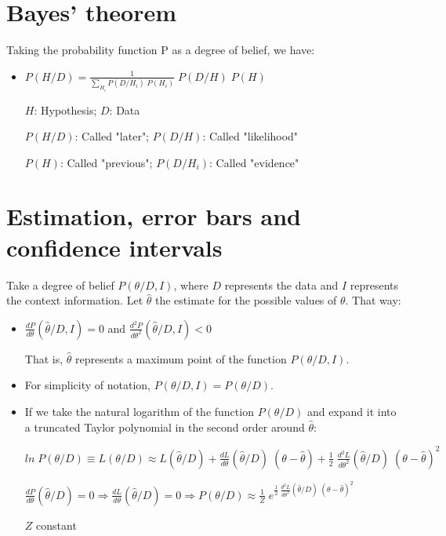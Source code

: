 \documentclass{article}
\begin{document}
\section{Bayes' theorem}

Taking the probability function P as a degree of belief, we have:

\begin{itemize}

\item $P(H/D) = \frac{1}{\sum\limits_{H_{i}} P(D/H_{i}) \; P(H_{i})} \; P(D/H) \; P(H)$

$H$: Hypothesis; $D$: Data

$P(H/D)$: Called "later"; $P(D/H)$: Called "likelihood"

$P(H)$: Called "previous"; $P(D/H_{i})$: Called "evidence"

\end{itemize}

\section{Estimation, error bars and confidence intervals}

Take a degree of belief $P(\theta/D,I)$, where $D$ represents the data and $I$ represents the context information. Let $\hat{\theta}$ the estimate for the possible values of $\theta$. That way:

\begin{itemize}

\item $\frac{dP}{d\theta} (\hat{\theta}/D,I) = 0$ and $\frac{d^{2}P}{d\theta^{2}} (\hat{\theta}/D,I) < 0$

That is, $\hat{\theta}$ represents a maximum point of the function $P(\theta/D,I)$.

\item For simplicity of notation, $P(\theta/D,I) = P(\theta/D)$.

\item If we take the natural logarithm of the function $P(\theta/D)$ and expand it into a truncated Taylor polynomial in the second order around $\hat{\theta}$:

$ln \; P(\theta/D) \equiv L(\theta/D) \approx L(\hat{\theta}/D) + \frac{dL}{d\theta} (\hat{\theta}/D) \; (\theta - \hat{\theta}) + \frac{1}{2} \; \frac{d^{2}L}{d\theta^{2}} (\hat{\theta}/D) \; (\theta - \hat{\theta})^{2}$

$\frac{dP}{d\theta} (\hat{\theta}/D) = 0 \Rightarrow \frac{dL}{d\theta} (\hat{\theta}/D) = 0 \Rightarrow P(\theta/D) \approx \frac{1}{Z} \; e^{\frac{1}{2} \; \frac{d^{2}L}{d\theta^{2}} (\hat{\theta}/D) \; (\theta - \hat{\theta})^{2}}$

$Z$ constant

\end{itemize}
\end{document}
